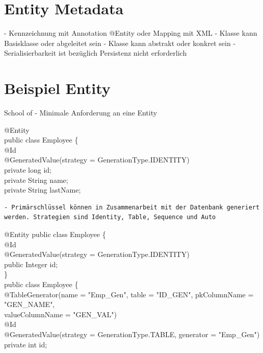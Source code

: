 \section*{Entity Metadata}
- Kennzeichnung mit Annotation @Entity oder Mapping mit XML
- Klasse kann Basisklasse oder abgeleitet sein
- Klasse kann abstrakt oder konkret sein
- Serialisierbarkeit ist bezüglich Persistenz nicht erforderlich

\section*{Beispiel Entity}

School of
- Minimale Anforderung an eine Entity


@Entity\\
public class Employee \{\\
@Id\\
@GeneratedValue(strategy = GenerationType.IDENTITY)\\
private long id;\\
private String name;\\
private String lastName;

\begin{verbatim}
- Primärschlüssel können in Zusammenarbeit mit der Datenbank generiert werden. Strategien sind Identity, Table, Sequence und Auto
\end{verbatim}

@Entity public class Employee \{\\
@Id\\
@GeneratedValue(strategy = GenerationType.IDENTITY)\\
public Integer id;\\
\}\\
public class Employee \{\\
@TableGenerator(name = "Emp\_Gen", table = "ID\_GEN", pkColumnName = "GEN\_NAME",\\
valueColumnName = "GEN\_VAL")\\
@Id\\
@GeneratedValue(strategy = GenerationType.TABLE, generator = "Emp\_Gen")\\
private int id;



